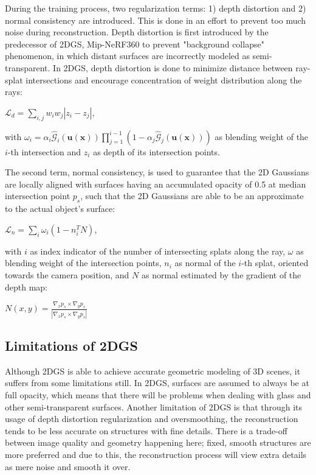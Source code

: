 During the training process, two regularization terms: 1) depth distortion and 2) normal consistency are introduced. This is done in an effort to prevent too much noise during reconstruction. Depth distortion is first introduced by the predecessor of 2DGS, Mip-NeRF360 \parencite{mipnerf} to prevent "background collapse" phenomenon, in which distant surfaces are incorrectly modeled as semi-transparent. In 2DGS, depth distortion is done to minimize distance between ray-splat intersections and encourage concentration of weight distribution along the rays:

\begin{center}
    \(\mathcal{L}_d = \sum\limits_{i, j} w_iw_j|z_i - z_j|\),
\end{center}
with \(\omega_i = \alpha_i \hat{\mathcal{G}}_i(\mathbf{u(x)}) \prod\limits_{j = 1}^{i - 1} (1 - \alpha_j \hat{\mathcal{G}}_j(\mathbf{u(x)}))\) as blending weight of the \(i\)-th intersection and \(z_i\) as depth of its intersection points.

The second term, normal consistency, is used to guarantee that the 2D Gaussians are locally aligned with surfaces having an accumulated opacity of 0.5 at median intersection point \(p_s\), such that the 2D Gaussians are able to be an approximate to the actual object's surface:

\begin{center}
    \(\mathcal{L}_n = \sum\limits_i \omega_i(1 - n_i^TN)\),
\end{center}
with \(i\) as index indicator of the number of intersecting splats along the ray, \(\omega\) as blending weight of the intersection points, \(n_i\) as normal of the \(i\)-th splat, oriented towards the camera position, and \(N\) as normal estimated by the gradient of the depth map:

\begin{center}
    \(N(x, y) = \frac{\nabla_x p_s \times \nabla_y p_s}{|\nabla_x p_s \times \nabla_y p_s|}\)
\end{center}

\subsection{Limitations of 2DGS}

Although 2DGS is able to achieve accurate geometric modeling of 3D scenes, it suffers from some limitations still. In 2DGS, surfaces are assumed to always be at full opacity, which means that there will be problems when dealing with glass and other semi-transparent surfaces. Another limitation of 2DGS is that through its usage of depth distortion regularization and oversmoothing, the reconstruction tends to be less accurate on structures with fine details. There is a trade-off between image quality and geometry happening here; fixed, smooth structures are more preferred and due to this, the reconstruction process will view extra details as mere noise and smooth it over.

